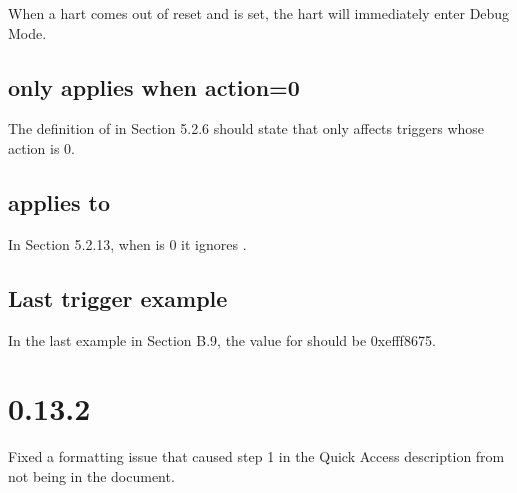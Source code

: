 When a hart comes out of reset and \Fhaltreq is set, the hart will immediately
enter Debug Mode.

\subsection{\Fmte only applies when action=0}

The definition of \Fmte in Section 5.2.6 should state that \Fmte only affects
triggers whose action is 0.

\subsection{\Fsselect applies to \Fsvalue}

In Section 5.2.13, when \Fsselect is 0 it ignores \Fsvalue.

\subsection{Last trigger example}

In the last example in Section B.9, the value for  should be
0xefff8675.

\section{0.13.2}

Fixed a formatting issue that caused step 1 in the Quick Access description
from not being in the document.
